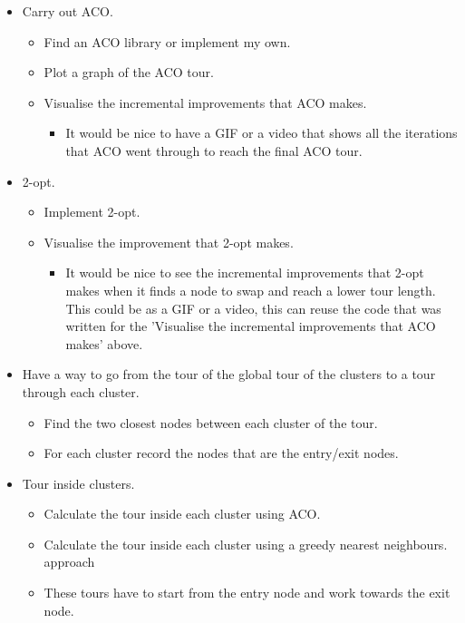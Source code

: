 \begin{itemize}
    \item Carry out ACO.
        \begin{itemize}
            \item Find an ACO library or implement my own.
            \item Plot a graph of the ACO tour.
            \item Visualise the incremental improvements that ACO makes.
                \begin{itemize}
                    \item It would be nice to have a GIF or a video that shows all the iterations that ACO went through to reach the final ACO tour.
                \end{itemize}
        \end{itemize}
    \item 2-opt.
        \begin{itemize}
            \item Implement 2-opt.
            \item Visualise the improvement that 2-opt makes.
                \begin{itemize}
                    \item It would be nice to see the incremental improvements that 2-opt makes when it finds a node to swap and reach a lower tour length. This could be as a GIF or a video, this can reuse the code that was written for the 'Visualise the incremental improvements that ACO makes' above.
                \end{itemize}
        \end{itemize}
    \item Have a way to go from the tour of the global tour of the clusters to a tour through each cluster.
        \begin{itemize}
            \item Find the two closest nodes between each cluster of the tour.
            \item For each cluster record the nodes that are the entry/exit nodes.
        \end{itemize}
    \item Tour inside clusters.
        \begin{itemize}
            \item Calculate the tour inside each cluster using ACO.
            \item Calculate the tour inside each cluster using a greedy nearest neighbours. approach
            \item These tours have to start from the entry node and work towards the exit node.

\end{itemize}
\end{itemize}

